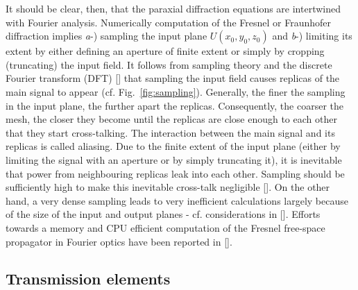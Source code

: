 \begin{refsection}
It should be clear, then, that the paraxial diffraction equations are intertwined with Fourier analysis. Numerically computation of the Fresnel or Fraunhofer diffraction implies \textit{a}-) sampling the input plane $U(x_0,y_0,z_0)$ and \textit{b}-) limiting its extent by either defining an aperture of finite extent or simply by cropping (truncating) the input field. It follows from sampling theory and the discrete Fourier transform (DFT) [\cite[\textit{§10}~\&~\textit{§11}]{Bracewell2000}] that sampling the input field causes replicas of the main signal to appear (cf. Fig.~\ref{fig:sampling}). Generally, the finer the sampling in the input plane, the further apart the replicas. Consequently, the coarser the mesh, the closer they become until the replicas are close enough to each other that they start cross-talking. The interaction between the main signal and its replicas is called aliasing. Due to the finite extent of the input plane (either by limiting the signal with an aperture or by simply truncating it), it is inevitable that power from neighbouring replicas leak into each other. Sampling should be sufficiently high to make this inevitable cross-talk negligible [\cite{Kelly2014}]. On the other hand, a very dense sampling leads to very inefficient calculations largely because of the size of the input and output planes - cf. considerations in [\cite[\textit{§5}]{Goodman2015}]. Efforts towards a memory and CPU efficient computation of the Fresnel free-space propagator in Fourier optics have been reported in [\cite{Chubar2019}].

\subsection{Transmission elements}\label{sec:thin_element}


\end{refsection}
